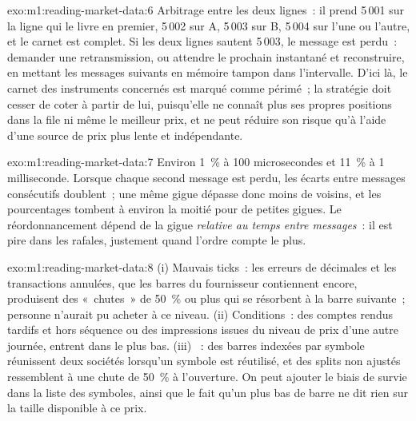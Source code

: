 \begin{solution}{exo:m1:reading-market-data:6}
Arbitrage entre les deux lignes~: il prend 5\,001 sur la ligne qui le livre en premier, 5\,002
sur A, 5\,003 sur B, 5\,004 sur l'une ou l'autre, et le carnet est complet. Si les deux lignes
sautent 5\,003, le message est perdu~: demander une retransmission, ou attendre
le prochain instantané et reconstruire, en mettant les messages suivants en mémoire tampon dans l'intervalle. D'ici
là, le carnet des instruments concernés est marqué comme périmé~; la stratégie
doit cesser de coter à partir de lui, puisqu'elle ne connaît plus ses propres positions dans la file
ni même le meilleur prix, et ne peut réduire son risque qu'à l'aide d'une
source de prix plus lente et indépendante.
\end{solution}

\begin{solution}{exo:m1:reading-market-data:7}
Environ 1~\% à 100 microsecondes et 11~\% à 1 milliseconde. Lorsque chaque second
message est perdu, les écarts entre messages consécutifs doublent~; une même gigue dépasse donc
moins de voisins, et les pourcentages tombent à environ la moitié
pour de petites gigues. Le réordonnancement dépend de la gigue \emph{relative au
temps entre messages}~: il est pire dans les rafales, justement quand l'ordre compte
le plus.
\end{solution}

\begin{solution}{exo:m1:reading-market-data:8}
(i) Mauvais ticks~: les erreurs de décimales et les transactions annulées, que les barres du fournisseur
contiennent encore, produisent des «~chutes~» de 50~\% ou plus qui se résorbent à la barre suivante~;
personne n'aurait pu acheter à ce niveau. (ii) Conditions~: des comptes rendus tardifs et hors séquence
ou des impressions issues du niveau de prix d'une autre journée, entrent dans le plus bas. (iii)
~: des barres indexées par symbole réunissent deux sociétés lorsqu'un symbole est réutilisé,
et des splits non ajustés ressemblent à une chute de 50~\% à l'ouverture. On peut ajouter
le biais de survie dans la liste des symboles, ainsi que le fait qu'un plus bas de barre ne dit rien
sur la taille disponible à ce prix.
\end{solution}

